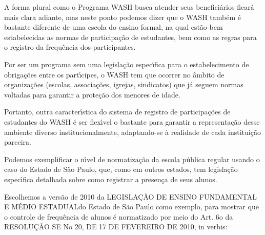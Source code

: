 \documentclass[
12pt,		%
openright,	%
twoside,  %
a4paper,			%
chapter=TITLE,		%
english,			%
french,				%
spanish,			%
brazil				%
]{USPSC-classe/USPSC}
\begin{document}
A forma plural como o Programa WASH busca atender seus benefici\'arios ficar\'a mais clara adiante, mas neste ponto podemos dizer que o WASH tamb\'em \'e bastante diferente de uma escola do ensino formal, na qual est\~ao bem estabelecidas as normas de participa\c{c}\~ao de estudantes, bem como as regras para o registro da frequ\^encia dos participantes.









Por ser um programa sem uma legisla\c{c}\~ao espec\'{\i}fica para o estabelecimento de obriga\c{c}\~oes entre os part\'{\i}cipes, o WASH tem que ocorrer no \^ambito de organiza\c{c}\~oes (escolas, associa\c{c}\~oes, igrejas, sindicatos) que j\'a seguem normas voltadas para garantir a prote\c{c}\~ao dos menores de idade.









Portanto, outra caracter\'{\i}stica do sistema de registro de participa\c{c}\~oes de estudantes do WASH \'e ser flex\'{\i}vel o bastante para garantir a representa\c{c}\~ao desse ambiente diverso institucionalmente, adaptando-se \`a realidade de cada institui\c{c}\~ao parceira.









Podemos exemplificar o n\'{\i}vel de normatiza\c{c}\~ao da escola p\'ublica regular usando o caso do Estado de S\~ao Paulo, que, como em outros estados, tem legisla\c{c}\~ao espec\'{\i}fica detalhada sobre como registrar a presen\c{c}a de seus alunos.









Escolhemos a vers\~ao de 2010 da \textquotedbl LEGISLA\c{C}\~AO DE ENSINO FUNDAMENTAL E M\'EDIO ESTADUAL\textquotedbl  do Estado de S\~ao Paulo como exemplo, para mostrar que o controle de frequ\^encia de alunos \'e normatizado por meio do Art. 6o da RESOLU\c{C}\~AO SE No 20, DE 17 DE FEVEREIRO DE 2010, in verbis:










\noindent\begin{center}\mbox{\centering{}}\end{center}
\end{document}
